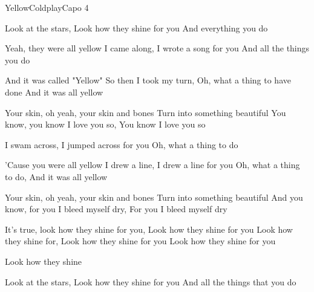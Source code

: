 \begin{song}{Yellow}{Coldplay}{Capo 4}


Look at the stars, Look how they shine for you
And everything you do

Yeah, they were all yellow
  I came along, I wrote a song for you
And all the things you do

And it was called "Yellow"
  So then I took my turn, Oh, what a thing to have done
And it was all yellow

      Your skin, oh yeah, your skin and bones
      Turn into something beautiful
      You know, you know I love you so, You know I love you so


I swam across, I jumped across for you
Oh, what a thing to do

'Cause you were all yellow
  I drew a line, I drew a line for you
Oh, what a thing to do, And it was all yellow

      Your skin, oh yeah, your skin and bones
      Turn into something beautiful
      And you know, for you I bleed myself dry, For you I bleed myself dry


It's true, look how they shine for you, Look how they shine for you
Look how they shine for, Look how they shine for you
Look how they shine for you

Look how they shine

  Look at the stars, Look how they shine for you
And all the things that you do
\end{song}
